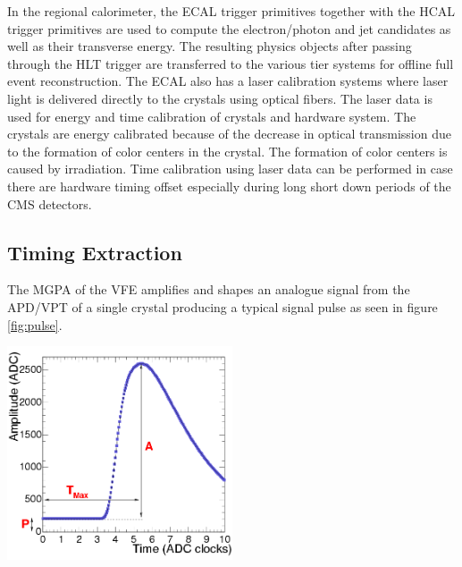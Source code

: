 In the regional calorimeter, the ECAL trigger primitives together with the HCAL trigger primitives are used to  compute the electron/photon and jet candidates as well as their transverse energy. The resulting physics objects after passing through the HLT trigger are transferred to the various tier systems for offline full event reconstruction. The ECAL also has a laser calibration systems where laser light is delivered directly to the \pb crystals using optical fibers. The laser data is used for energy and time calibration of crystals and hardware system. The crystals are energy calibrated because of the decrease in optical transmission due to the formation of color centers in the crystal. The formation of color centers is caused by irradiation. Time calibration using laser data can be performed in case there are hardware timing offset especially during long short down periods of the CMS detectors.
\subsection{Timing Extraction}
The MGPA of the VFE amplifies and shapes an analogue signal from the APD/VPT of a single crystal producing a typical signal pulse as seen in figure \ref{fig:pulse}. 

\begin{center}
\centering
\mbox{\includegraphics[height=0.5\textwidth, width=0.5\textwidth]{THESISPLOTS/Time_Amplitude_Profile.png}}
\label{fig:pulse}
\end{center}

